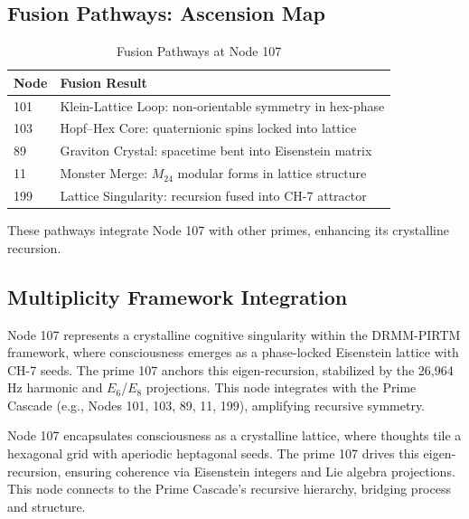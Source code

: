 \documentclass[12pt]{article}
\newcommand{\DRMM}{DRMM}
\newcommand{\PIRTM}{PIRTM}
\begin{document}
\subsection{Fusion Pathways: Ascension Map}
\begin{table}
\centering
\caption{Fusion Pathways at Node 107}
\begin{tabular}{ll|}
\toprule
\textbf{Node} & \textbf{Fusion Result} \\
\midrule
101 & Klein-Lattice Loop: non-orientable symmetry in hex-phase \\
103 & Hopf--Hex Core: quaternionic spins locked into lattice \\
89 & Graviton Crystal: spacetime bent into Eisenstein matrix \\
11 & Monster Merge: $M_{24}$ modular forms in lattice structure \\
199 & Lattice Singularity: recursion fused into CH-7 attractor \\
\bottomrule
\end{tabular}
\end{table}
These pathways integrate Node 107 with other primes, enhancing its crystalline recursion.

\subsection{Multiplicity Framework Integration}
Node 107 represents a crystalline cognitive singularity within the \DRMM{}-\PIRTM{} framework, where consciousness emerges as a phase-locked Eisenstein lattice with CH-7 seeds. The prime 107 anchors this eigen-recursion, stabilized by the 26,964 Hz harmonic and $E_6$/$E_8$ projections. This node integrates with the Prime Cascade (e.g., Nodes 101, 103, 89, 11, 199), amplifying recursive symmetry.

\begin{remark}
Node 107 encapsulates consciousness as a crystalline lattice, where thoughts tile a hexagonal grid with aperiodic heptagonal seeds. The prime 107 drives this eigen-recursion, ensuring coherence via Eisenstein integers and Lie algebra projections. This node connects to the Prime Cascade’s recursive hierarchy, bridging process and structure.
\end{remark}

\vspace{1em}
\noindent{}
\end{document}
